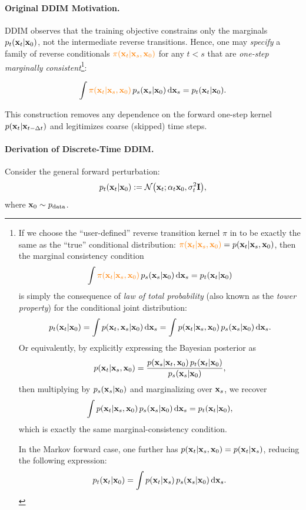 \paragraph{Original DDIM Motivation.}
DDIM observes that the training objective constrains only the marginals $p_t({\mathbf{x}}_t|{\mathbf{x}}_0)$, not the
intermediate reverse transitions. Hence, one may \emph{specify} a family of reverse conditionals
${\color{orange}\pi({\mathbf{x}}_t|{\mathbf{x}}_s,{\mathbf{x}}_0)}$ for any $t<s$ that are \emph{one-step marginally consistent}\footnote{If we choose the ``user-defined'' reverse transition kernel 
$\pi$ in  to be exactly the same as the ``true'' conditional distribution: ${\color{orange}\pi({\mathbf{x}}_t|{\mathbf{x}}_s,{\mathbf{x}}_0)} = p({\mathbf{x}}_t|{\mathbf{x}}_s, {\mathbf{x}}_0)$, 
then the marginal consistency condition
   \[
\int {\color{orange}\pi({\mathbf{x}}_t|{\mathbf{x}}_s,{\mathbf{x}}_0)}\,p_s({\mathbf{x}}_s|{\mathbf{x}}_0)\mathop{}\!\mathrm{d} {\mathbf{x}}_s
= p_t({\mathbf{x}}_t|{\mathbf{x}}_0)
\] 
is simply the consequence of \emph{law of total probability} (also known as the \emph{tower property}) for the conditional joint distribution:
\[
p_t({\mathbf{x}}_t|{\mathbf{x}}_0)
= \int p({\mathbf{x}}_t,{\mathbf{x}}_s|{\mathbf{x}}_0)\mathop{}\!\mathrm{d} {\mathbf{x}}_s
= \int p({\mathbf{x}}_t|{\mathbf{x}}_s,{\mathbf{x}}_0)\,p_s({\mathbf{x}}_s|{\mathbf{x}}_0)\mathop{}\!\mathrm{d} {\mathbf{x}}_s.
\]
Or equivalently, by explicitly expressing the Bayesian posterior as
\[
p({\mathbf{x}}_t|{\mathbf{x}}_s,{\mathbf{x}}_0)
= \frac{p({\mathbf{x}}_s|{\mathbf{x}}_t,{\mathbf{x}}_0)\,p_t({\mathbf{x}}_t|{\mathbf{x}}_0)}
       {p_s({\mathbf{x}}_s|{\mathbf{x}}_0)},
\]
then multiplying by $p_s({\mathbf{x}}_s|{\mathbf{x}}_0)$ and marginalizing over ${\mathbf{x}}_s$, we
recover
\[
\int p({\mathbf{x}}_t|{\mathbf{x}}_s,{\mathbf{x}}_0)\,p_s({\mathbf{x}}_s|{\mathbf{x}}_0) \mathop{}\!\mathrm{d} {\mathbf{x}}_s
= p_t({\mathbf{x}}_t|{\mathbf{x}}_0),
\]
which is exactly the same marginal-consistency condition.

In the Markov forward case, one further has 
$p({\mathbf{x}}_t|{\mathbf{x}}_s,{\mathbf{x}}_0)=p({\mathbf{x}}_t|{\mathbf{x}}_s)$, 
reducing the following expression:
\[
p_t({\mathbf{x}}_t|{\mathbf{x}}_0)
= \int p({\mathbf{x}}_t|{\mathbf{x}}_s)\,p_s({\mathbf{x}}_s|{\mathbf{x}}_0)\mathop{}\!\mathrm{d} {\mathbf{x}}_s.
\]
}:
\begin{mdframed}
    \begin{align}\label{eq:ddim-reverse-kernel-def}
\int {\color{orange}\pi({\mathbf{x}}_t|{\mathbf{x}}_s,{\mathbf{x}}_0)}\,p_s({\mathbf{x}}_s|{\mathbf{x}}_0) \mathop{}\!\mathrm{d} {\mathbf{x}}_s
= p_t({\mathbf{x}}_t|{\mathbf{x}}_0).
\end{align}
\end{mdframed}
This construction removes any dependence on the forward one-step kernel $p({\mathbf{x}}_t|{\mathbf{x}}_{t-\Delta t})$
and legitimizes coarse (skipped) time steps. 

\paragraph{Derivation of Discrete-Time DDIM.}
Consider the general forward perturbation:
\begin{equation*}
    p_t({\mathbf{x}}_t|{\mathbf{x}}_0) := \mathcal{N}\big({\mathbf{x}}_t; \alpha_t {\mathbf{x}}_0, \sigma_t^2 \mathbf{I}\big),
\end{equation*}
where ${\mathbf{x}}_0 \sim p_{\mathrm{data}}$. 



